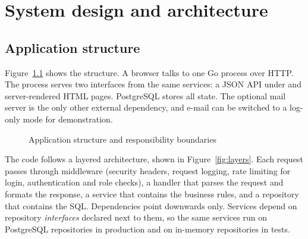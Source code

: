 \chapter{System design and architecture}

\section{Application structure}

Figure~\ref{fig:arch} shows the structure. A browser talks to one Go process over HTTP. The process serves two interfaces from the same services: a JSON API under  and server-rendered HTML pages. PostgreSQL stores all state. The optional mail server is the only other external dependency, and e-mail can be switched to a log-only mode for demonstration.

\begin{figure}[H]
\centering
{}
\caption{Application structure and responsibility boundaries}
\label{fig:arch}
\end{figure}

The code follows a layered architecture, shown in Figure~\ref{fig:layers}. Each request passes through middleware (security headers, request logging, rate limiting for login, authentication and role checks), a handler that parses the request and formats the response, a service that contains the business rules, and a repository that contains the SQL. Dependencies point downwards only. Services depend on repository \emph{interfaces} declared next to them, so the same services run on PostgreSQL repositories in production and on in-memory repositories in tests.

